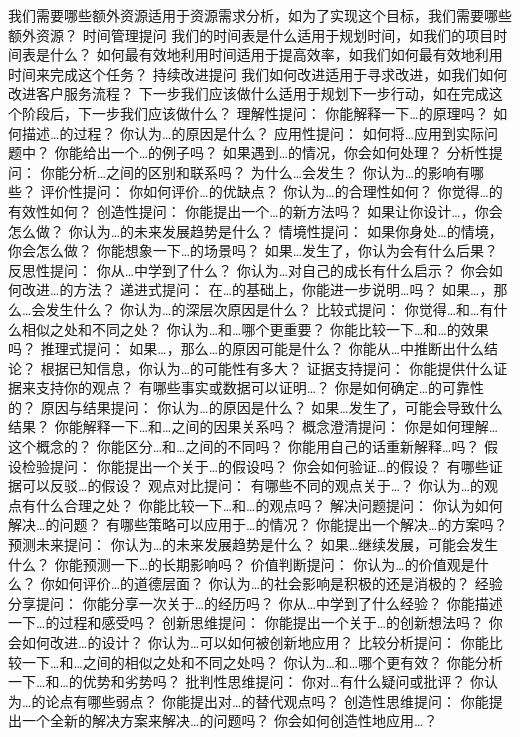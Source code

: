 \documentclass[12pt]{book}
\begin{document}
我们需要哪些额外资源适用于资源需求分析，如为了实现这个目标，我们需要哪些额外资源？
时间管理提问
我们的时间表是什么适用于规划时间，如我们的项目时间表是什么？
如何最有效地利用时间适用于提高效率，如我们如何最有效地利用时间来完成这个任务？
持续改进提问
我们如何改进适用于寻求改进，如我们如何改进客户服务流程？
下一步我们应该做什么适用于规划下一步行动，如在完成这个阶段后，下一步我们应该做什么？
理解性提问：
你能解释一下…的原理吗？
如何描述…的过程？
你认为…的原因是什么？
应用性提问：
如何将…应用到实际问题中？
你能给出一个…的例子吗？
如果遇到…的情况，你会如何处理？
分析性提问：
你能分析…之间的区别和联系吗？
为什么…会发生？
你认为…的影响有哪些？
评价性提问：
你如何评价…的优缺点？
你认为…的合理性如何？
你觉得…的有效性如何？
创造性提问：
你能提出一个…的新方法吗？
如果让你设计…，你会怎么做？
你认为…的未来发展趋势是什么？
情境性提问：
如果你身处…的情境，你会怎么做？
你能想象一下…的场景吗？
如果…发生了，你认为会有什么后果？
反思性提问：
你从…中学到了什么？
你认为…对自己的成长有什么启示？
你会如何改进…的方法？
递进式提问：
在…的基础上，你能进一步说明…吗？
如果…，那么…会发生什么？
你认为…的深层次原因是什么？
比较式提问：
你觉得…和…有什么相似之处和不同之处？
你认为…和…哪个更重要？
你能比较一下…和…的效果吗？
推理式提问：
如果…，那么…的原因可能是什么？
你能从…中推断出什么结论？
根据已知信息，你认为…的可能性有多大？
证据支持提问：
你能提供什么证据来支持你的观点？
有哪些事实或数据可以证明…？
你是如何确定…的可靠性的？
原因与结果提问：
你认为…的原因是什么？
如果…发生了，可能会导致什么结果？
你能解释一下…和…之间的因果关系吗？
概念澄清提问：
你是如何理解…这个概念的？
你能区分…和…之间的不同吗？
你能用自己的话重新解释…吗？
假设检验提问：
你能提出一个关于…的假设吗？
你会如何验证…的假设？
有哪些证据可以反驳…的假设？
观点对比提问：
有哪些不同的观点关于…？
你认为…的观点有什么合理之处？
你能比较一下…和…的观点吗？
解决问题提问：
你认为如何解决…的问题？
有哪些策略可以应用于…的情况？
你能提出一个解决…的方案吗？
预测未来提问：
你认为…的未来发展趋势是什么？
如果…继续发展，可能会发生什么？
你能预测一下…的长期影响吗？
价值判断提问：
你认为…的价值观是什么？
你如何评价…的道德层面？
你认为…的社会影响是积极的还是消极的？
经验分享提问：
你能分享一次关于…的经历吗？
你从…中学到了什么经验？
你能描述一下…的过程和感受吗？
创新思维提问：
你能提出一个关于…的创新想法吗？
你会如何改进…的设计？
你认为…可以如何被创新地应用？
比较分析提问：
你能比较一下…和…之间的相似之处和不同之处吗？
你认为…和…哪个更有效？
你能分析一下…和…的优势和劣势吗？
批判性思维提问：
你对…有什么疑问或批评？
你认为…的论点有哪些弱点？
你能提出对…的替代观点吗？
创造性思维提问：
你能提出一个全新的解决方案来解决…的问题吗？
你会如何创造性地应用…？
\end{document}

